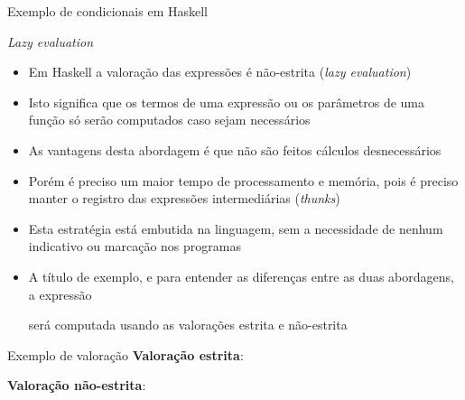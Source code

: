 \begin{frame}[fragile]{Exemplo de condicionais em Haskell}


\end{frame}

\begin{frame}[fragile]{\it Lazy evaluation}

    \begin{itemize}
        \item Em Haskell a valoração das expressões é não-estrita (\textit{lazy evaluation})

        \item Isto significa que os termos de uma expressão ou os parâmetros de uma função
            só serão computados caso sejam necessários

        \item As vantagens desta abordagem é que não são feitos cálculos desnecessários

        \item Porém é preciso um maior tempo de processamento e memória, pois é preciso manter
            o registro das expressões intermediárias (\textit{thunks})

        \item Esta estratégia está embutida na linguagem, sem a necessidade de nenhum indicativo
            ou marcação nos programas

        \item A título de exemplo, e para entender as diferenças entre as duas abordagens, a 
        expressão


        será computada usando as valorações estrita e não-estrita
    \end{itemize}

\end{frame}

\begin{frame}[fragile]{Exemplo de valoração}
    \textbf{Valoração estrita}:
    \vspace{0.1in}

    \vspace{0.3in}

    \textbf{Valoração não-estrita}:
    \vspace{0.1in}
\end{frame}

